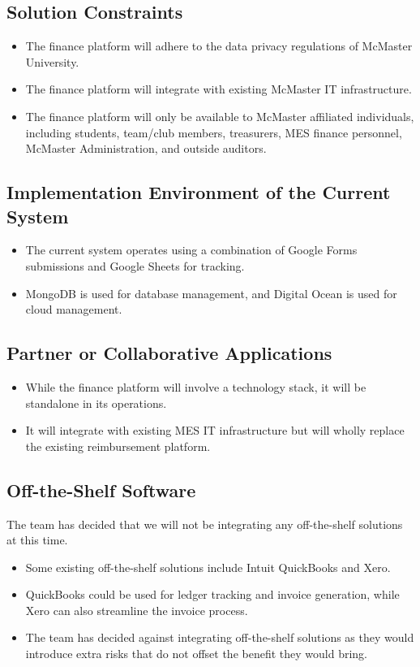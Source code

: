 \documentclass[12pt]{article}
\begin{document}
\subsection{Solution Constraints}
\begin{itemize}
    \item The finance platform will adhere to the data privacy regulations of McMaster University.
    \item The finance platform will integrate with existing McMaster IT infrastructure.
    \item The finance platform will only be available to McMaster affiliated individuals, including students, team/club members, treasurers, MES finance personnel, McMaster Administration, and outside auditors.
\end{itemize}

\subsection{Implementation Environment of the Current System}
\begin{itemize}
    \item The current system operates using a combination of Google Forms submissions and Google Sheets for tracking. 
    \item MongoDB is used for database management, and Digital Ocean is used for cloud management.
\end{itemize}

\subsection{Partner or Collaborative Applications}
\begin{itemize}
    \item While the finance platform will involve a technology stack, it will be standalone in its operations.
    \item It will integrate with existing MES IT infrastructure but will wholly replace the existing reimbursement platform.
\end{itemize}
 

\subsection{Off-the-Shelf Software}
The team has decided that we will not be integrating any off-the-shelf solutions at this time.

\begin{itemize}
    \item Some existing off-the-shelf solutions include Intuit QuickBooks and Xero.
    \item QuickBooks could be used for ledger tracking and invoice generation, while Xero can also streamline the invoice process.
    \item The team has decided against integrating off-the-shelf solutions as they would introduce extra risks that do not offset the benefit they would bring. 
\end{itemize}
 
\end{document}
